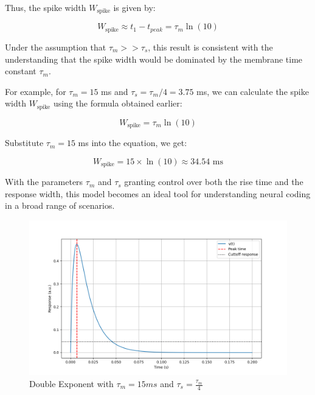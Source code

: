 Thus, the spike width $W_{\text{{spike}}}$ is given by:

\begin{equation}
W_{\text{{spike}}} \approx t_1 - t_{peak} = \tau_m \ln(10)
\end{equation}

Under the assumption that $\tau_m >> \tau_s$, this result is consistent with the understanding that the spike width would be dominated by the membrane time constant $\tau_m$. 

For example, for $\tau_m = 15$ ms and $\tau_s = \tau_m / 4 = 3.75$ ms, we can calculate the spike width $W_{\text{{spike}}}$ using the formula obtained earlier:

\begin{equation}
W_{\text{{spike}}} = \tau_m \ln(10)
\end{equation}

Substitute $\tau_m = 15$ ms into the equation, we get:

\begin{equation}
W_{\text{{spike}}} = 15 \times \ln(10) \approx 34.54 \text{ ms}
\end{equation}

With the parameters $\tau_m$ and $\tau_s$ granting control over both the rise time and the response width, this model becomes an ideal tool for understanding neural coding in a broad range of scenarios.

\begin{figure}[H]
    \centering
    \includegraphics[width=0.5\linewidth]{methods//computational-models//graphs/model_analysis.png}
    \caption{Double Exponent with $\tau_m=15ms$ and $\tau_s=\frac{\tau_m}{4}$ }
    \label{fig:exm-double-exp}
\end{figure}